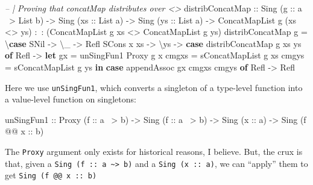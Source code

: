 \documentclass[]{article}
\newenvironment{Shaded}{\begin{snugshade}}{\end{snugshade}}
\newcommand{\CommentTok}[1]{\textcolor[rgb]{0.56,0.35,0.01}{\textit{#1}}}
\newcommand{\DataTypeTok}[1]{\textcolor[rgb]{0.13,0.29,0.53}{#1}}
\newcommand{\FunctionTok}[1]{\textcolor[rgb]{0.00,0.00,0.00}{#1}}
\newcommand{\KeywordTok}[1]{\textcolor[rgb]{0.13,0.29,0.53}{\textbf{#1}}}
\newcommand{\NormalTok}[1]{#1}
\newcommand{\OtherTok}[1]{\textcolor[rgb]{0.56,0.35,0.01}{#1}}
\begin{document}
\begin{Shaded}
\begin{Highlighting}[]
\CommentTok{-- | Proving that concatMap distributes over <>}
\NormalTok{distribConcatMap}
\OtherTok{    ::} \DataTypeTok{Sing}\NormalTok{ (}\OtherTok{g ::}\NormalTok{ a }\FunctionTok{~>} \DataTypeTok{List}\NormalTok{ b)}
    \OtherTok{->} \DataTypeTok{Sing}\NormalTok{ (}\OtherTok{xs ::} \DataTypeTok{List}\NormalTok{ a)}
    \OtherTok{->} \DataTypeTok{Sing}\NormalTok{ (}\OtherTok{ys ::} \DataTypeTok{List}\NormalTok{ a)}
    \OtherTok{->} \DataTypeTok{ConcatMapList}\NormalTok{ g (xs }\FunctionTok{<>}\NormalTok{ ys) }\FunctionTok{:~:}\NormalTok{ (}\DataTypeTok{ConcatMapList}\NormalTok{ g xs }\FunctionTok{<>} \DataTypeTok{ConcatMapList}\NormalTok{ g ys)}
\NormalTok{distribConcatMap g }\FunctionTok{=}\NormalTok{ \textbackslash{}}\KeywordTok{case}
    \DataTypeTok{SNil} \OtherTok{->}\NormalTok{ \textbackslash{}_ }\OtherTok{->} \DataTypeTok{Refl}
    \DataTypeTok{SCons}\NormalTok{ x xs }\OtherTok{->}\NormalTok{ \textbackslash{}ys }\OtherTok{->}
      \KeywordTok{case}\NormalTok{ distribConcatMap g xs ys }\KeywordTok{of}
        \DataTypeTok{Refl} \OtherTok{->}
          \KeywordTok{let}\NormalTok{ gx    }\FunctionTok{=}\NormalTok{ unSingFun1 }\DataTypeTok{Proxy}\NormalTok{ g x}
\NormalTok{              cmgxs }\FunctionTok{=}\NormalTok{ sConcatMapList g xs}
\NormalTok{              cmgys }\FunctionTok{=}\NormalTok{ sConcatMapList g ys}
          \KeywordTok{in}  \KeywordTok{case}\NormalTok{ appendAssoc gx cmgxs cmgys }\KeywordTok{of}
                \DataTypeTok{Refl} \OtherTok{->} \DataTypeTok{Refl}
\end{Highlighting}
\end{Shaded}

Here we use \texttt{unSingFun1}, which converts a singleton of a type-level
function into a value-level function on singletons:

\begin{Shaded}
\begin{Highlighting}[]
\NormalTok{unSingFun1}
\OtherTok{    ::} \DataTypeTok{Proxy}\NormalTok{ (}\OtherTok{f      ::}\NormalTok{ a }\FunctionTok{~>}\NormalTok{ b)}
    \OtherTok{->} \DataTypeTok{Sing}\NormalTok{  (}\OtherTok{f      ::}\NormalTok{ a }\FunctionTok{~>}\NormalTok{ b)}
    \OtherTok{->} \DataTypeTok{Sing}\NormalTok{  (}\OtherTok{x      ::}\NormalTok{ a)}
    \OtherTok{->} \DataTypeTok{Sing}\NormalTok{  (f }\FunctionTok{@@}\OtherTok{ x ::}\NormalTok{ b)}
\end{Highlighting}
\end{Shaded}

The \texttt{Proxy} argument only exists for historical reasons, I believe. But,
the crux is that, given a
\texttt{Sing\ (f\ ::\ a\ \textasciitilde{}\textgreater{}\ b)} and a
\texttt{Sing\ (x\ ::\ a)}, we can ``apply'' them to get
\texttt{Sing\ (f\ @@\ x\ ::\ b)}
\end{document}
